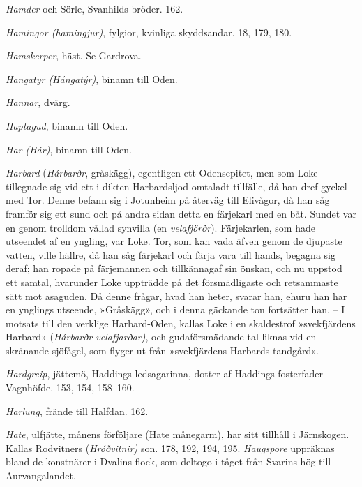 \emph{Hamder} och Sörle, Svanhilds bröder. 162.

\emph{Hamingor (hamingjur)}, fylgior, kvinliga skyddsandar. 18, 179,
180.

\emph{Hamskerper}, häst. Se Gardrova.

\emph{Hangatyr (Hángatýr)}, binamn till Oden.

\emph{Hannar}, dvärg.

\emph{Haptagud}, binamn till Oden.

\emph{Har (Hár)}, binamn till Oden.

\emph{Harbard} (\emph{Hárbarðr}, gråskägg), egentligen ett Odensepitet,
men som Loke tillegnade sig vid ett i dikten Harbardsljod omtaladt
tillfälle, då han dref gyckel med Tor. Denne befann sig i Jotunheim på
återväg till Elivågor, då han såg framför sig ett sund och på andra
sidan detta en färjekarl med en båt. Sundet var en genom trolldom vållad
synvilla (en \emph{velafjörðr}). Färjekarlen, som hade utseendet af en
yngling, var Loke. Tor, som kan vada äfven genom de djupaste vatten,
ville hällre, då han såg färjekarl och färja vara till hands, begagna
sig deraf; han ropade på färjemannen och tillkännagaf sin önskan, och nu
uppstod ett samtal, hvarunder Loke uppträdde på det försmädligaste och
retsammaste sätt mot asaguden. Då denne frågar, hvad han heter, svarar
han, ehuru han har en ynglings utseende, »Gråskägg», och i denna
gäckande ton fortsätter han. -- I motsats till den verklige
Harbard-Oden, kallas Loke i en skaldestrof »svekfjärdens Harbard»
(\emph{Hárbarðr velafjarðar)}, och gudaförsmädande tal liknas vid en
skränande sjöfågel, som flyger ut från »svekfjärdens Harbards tandgård».

\emph{Hardgreip}, jättemö, Haddings ledsagarinna, dotter af Haddings
fosterfader Vagnhöfde. 153, 154, 158--160.

\emph{Harlung}, frände till Halfdan. 162.

\emph{Hate}, ulfjätte, månens förföljare (Hate månegarm), har sitt
tillhåll i Järnskogen. Kallas Rodvitners (\emph{Hróðvitnir)} son. 178,
192, 194, 195. \emph{Haugspore} uppräknas bland de konstnärer i Dvalins
flock, som deltogo i tåget från Svarins hög till Aurvangalandet.

\protect\hypertarget{lb1625905.xhtmlux5cux23start223}{}{}\protect\hypertarget{lb1625905.xhtmlux5cux23start223-a}{}{}\protect\hypertarget{lb1625905.xhtmlux5cux23start223-b}{}{}\protect\hypertarget{lb1625905.xhtmlux5cux23start223-c}{}{}\protect\hypertarget{lb1625905.xhtmlux5cux23start223-d}{}{}

